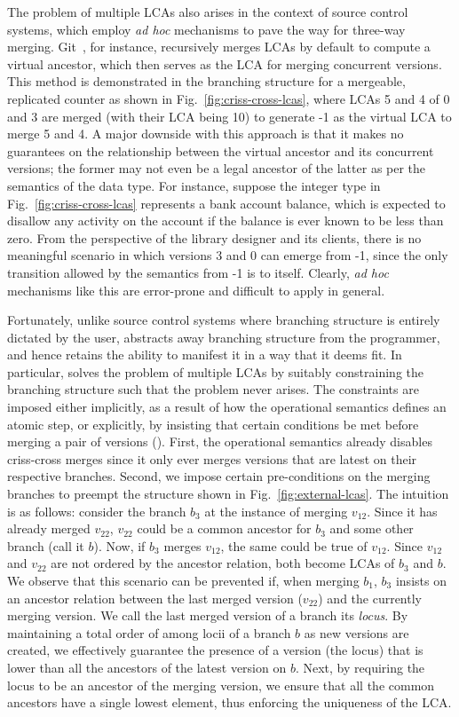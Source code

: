 The problem of multiple LCAs also arises in the context of source
control systems, which employ \emph{ad hoc} mechanisms to pave the way
for three-way merging.  Git~\cite{git}, for instance,
recursively merges LCAs by default to compute a virtual ancestor, which then
serves as the LCA for merging concurrent versions. This method is
demonstrated in the branching structure for a mergeable, replicated
counter as shown in Fig.~\ref{fig:criss-cross-lcas}, where LCAs 5 and
4 of 0 and 3 are merged (with their LCA being 10) to generate -1 as
the virtual LCA to merge 5 and 4. A major downside with this approach
is that it makes no guarantees on the relationship between the virtual
ancestor and its concurrent versions; the former may not even be a
legal ancestor of the latter as per the semantics of the data type.
For instance, suppose the integer type in
Fig.~\ref{fig:criss-cross-lcas} represents a bank account balance,
which is expected to disallow any activity on the account if the
balance is ever known to be less than zero.  From the perspective of
the library designer and its clients, there is no meaningful scenario
in which versions 3 and 0 can emerge from -1, since the only
transition allowed by the semantics from -1 is to itself.  Clearly,
\emph{ad hoc} mechanisms like this are error-prone and difficult to
apply in general.

Fortunately, unlike source control systems where branching structure
is entirely dictated by the user, \name abstracts away branching
structure from the programmer, and hence retains the ability to
manifest it in a way that it deems fit. In particular, \name solves
the problem of multiple LCAs by suitably constraining the branching
structure such that the problem never arises. The constraints are
imposed either implicitly, as a result of how the operational semantics
defines an atomic step, or explicitly, by insisting that certain
conditions be met before merging a pair of versions
(). First, the operational semantics already
disables criss-cross merges since it only ever merges versions that
are latest on their respective branches. Second, we impose certain
pre-conditions on the merging branches to preempt the structure shown
in Fig.~\ref{fig:external-lcas}. The intuition is as follows: consider
the branch $b_3$ at the instance of merging $v_{12}$. Since it has
already merged $v_{22}$, $v_{22}$ could be a common ancestor for $b_3$
and some other branch (call it $b$). Now, if $b_3$ merges $v_{12}$,
the same could be true of $v_{12}$. Since $v_{12}$ and $v_{22}$ are not
ordered by the ancestor relation, both become LCAs of
$b_3$ and $b$. We observe that this scenario can be prevented if, when
merging $b_1$, $b_3$ insists on an ancestor relation between the last
merged version ($v_{22}$) and the currently merging version.  We call
the last merged version of a branch its \emph{locus}. By maintaining a
total order of among locii of a branch $b$ as new versions are
created, we effectively guarantee the presence of a version (the
locus) that is lower than all the ancestors of the latest version on
$b$. Next, by requiring the locus to be an ancestor of the merging
version, we ensure that all the common ancestors have a single lowest
element, thus enforcing the uniqueness of the LCA.

